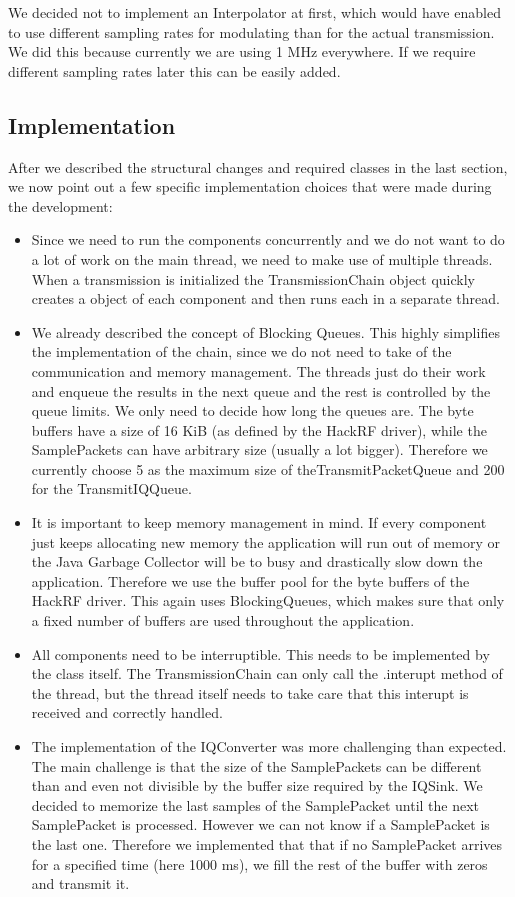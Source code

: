 We decided not to implement an Interpolator at first, which would have enabled to use different sampling rates for modulating than for the actual transmission. We did this because currently we are using 1 MHz everywhere. If we require different sampling rates later this can be easily added. 

\subsection{Implementation}

After we described the structural changes and required classes in the last section, we now point out a few specific implementation choices that were made during the development: 
\begin{itemize}
	\item Since we need to run the components concurrently and we do not want to do a lot of work on the main thread, we need to make use of multiple threads. When a transmission is initialized the TransmissionChain object quickly creates a object of each component and then runs each in a separate thread. 
	\item We already described the concept of Blocking Queues. This highly simplifies the implementation of the chain, since we do not need to take of the communication and memory management. The threads just do their work and enqueue the results in the next queue and the rest is controlled by the queue limits. We only need to decide how long the queues are. The byte buffers have a size of 16 KiB (as defined by the HackRF driver), while the SamplePackets can have arbitrary size (usually a lot bigger). Therefore we currently choose 5 as the maximum size of theTransmitPacketQueue and 200 for the TransmitIQQueue. 
	
	\item It is important to keep memory management in mind. If every component just keeps allocating new memory the application will run out of memory or the Java Garbage Collector will be to busy and drastically slow down the application. Therefore we use the buffer pool for the byte buffers of the HackRF driver. This again uses BlockingQueues, which makes sure that only a fixed number of buffers are used throughout the application.  
	
	\item All components need to be interruptible. This needs to be implemented by the class itself. The TransmissionChain can only call the .interupt method of the thread, but the thread itself needs to take care that this interupt is received and correctly handled. 
	
	\item The implementation of the IQConverter was more challenging than expected. The main challenge is that the size of the SamplePackets can be different than and even not divisible by the buffer size required by the IQSink. We decided to memorize the last samples of the SamplePacket until the next SamplePacket is processed. However we can not know if a SamplePacket is the last one. Therefore we implemented that that if no SamplePacket arrives for a specified time (here 1000 ms), we fill the rest of the buffer with zeros and transmit it. 
\end{itemize}

